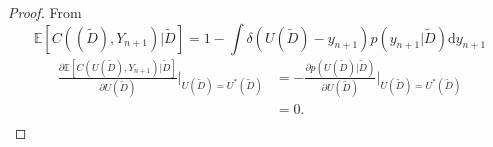 \begin{proof}
	From 
	\begin{equation}
		\mathbb{E}[C((\tilde{D}), Y_{n+1})|\tilde{D}] = 1-\int \delta(U(\tilde{D})-y_{n+1}) p(y_{n+1}|\tilde{D})\mathrm{d}y_{n+1}
	\end{equation}
	\begin{equation}
		\begin{split}
			\frac{\partial \mathbb{E}[C(U(\tilde{D}), Y_{n+1})|\tilde{D}]}{\partial U(\tilde{D})}\bigg|_{U(\tilde{D})=U^*(\tilde{D})} &= -\frac{\partial p(U(\tilde{D})|\tilde{D})}{\partial U(\tilde{D})}\bigg|_{U(\tilde{D})=U^*(\tilde{D})}\\
			&=0.\\
		\end{split}
	\end{equation}
\end{proof}


